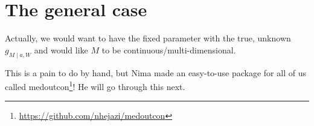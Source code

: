 \documentclass[
  12pt, krantz2,
]{book}
\makeatletter
\newenvironment{Shaded}{\begin{snugshade}}{\end{snugshade}}
\newcommand{\CommentTok}[1]{\textcolor[rgb]{0.56,0.35,0.01}{\textit{#1}}}
\newcommand{\KeywordTok}[1]{\textcolor[rgb]{0.13,0.29,0.53}{\textbf{#1}}}
\newcommand{\NormalTok}[1]{#1}
\newcommand{\OperatorTok}[1]{\textcolor[rgb]{0.81,0.36,0.00}{\textbf{#1}}}
\newcommand{\StringTok}[1]{\textcolor[rgb]{0.31,0.60,0.02}{#1}}
\renewcommand{\href}[2]{#2\footnote{\url{#1}}}
\newenvironment{kframe}{%
\medskip{}
\setlength{\fboxsep}{.8em}
 \def\at@end@of@kframe{}%
 \ifinner\ifhmode%
  \def\at@end@of@kframe{\end{minipage}}%
  \begin{minipage}{\columnwidth}%
 \fi\fi%
 \def\FrameCommand##1{\hskip\@totalleftmargin \hskip-\fboxsep
 \colorbox{shadecolor}{##1}\hskip-\fboxsep
     \hskip-\linewidth \hskip-\@totalleftmargin \hskip\columnwidth}%
 \MakeFramed {\advance\hsize-\width
   \@totalleftmargin\z@ \linewidth\hsize
   \@setminipage}}%
 {\par\unskip\endMakeFramed%
 \at@end@of@kframe}
\renewenvironment{Shaded}{\begin{kframe}}{\end{kframe}}
\theoremstyle{definition}
\theoremstyle{definition}
\theoremstyle{definition}
\newcommand{\1}{\mathbbm{1}}
\makeatother
\begin{document}
\begin{Shaded}
\end{Shaded}

\hypertarget{the-general-case}{%
\section{The general case}\label{the-general-case}}

Actually, we would want to have the fixed parameter with the true, unknown
\(g_{M \mid a, W}\) and would like \(M\) to be continuous/multi-dimensional.

This is a pain to do by hand, but Nima made an easy-to-use package for all of us
called \href{https://github.com/nhejazi/medoutcon}{medoutcon}! He will go through
this next.

  

\backmatter
\printindex
\end{document}
